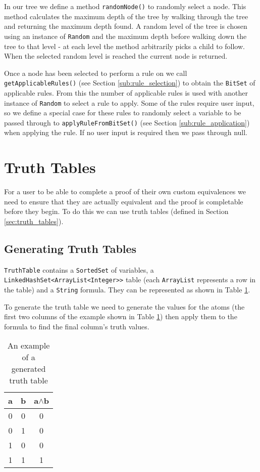 \documentclass{report}
\begin{document}
In our tree we define a method {\tt randomNode()} to randomly select a node. This method calculates the maximum depth of the tree by walking through the tree and returning the maximum depth found. A random level of the tree is chosen using an instance of {\tt Random} and the maximum depth before walking down the tree to that level - at each level the method arbitrarily picks a child to follow. When the selected random level is reached the current node is returned.

Once a node has been selected to perform a rule on we call {\tt getApplicableRules()} (see Section \ref{sub:rule_selection}) to obtain the {\tt BitSet} of applicable rules. From this the number of applicable rules is used with another instance of {\tt Random} to select a rule to apply. Some of the rules require user input, so we define a special case for these rules to randomly select a variable to be passed through to {\tt applyRuleFromBitSet()} (see Section \ref{sub:rule_application}) when applying the rule. If no user input is required then we pass through null.

\section{Truth Tables}
\label{sec:generating_truth_tables}

For a user to be able to complete a proof of their own custom equivalences we need to ensure that they are actually equivalent and the proof is completable before they begin. To do this we can use truth tables (defined in Section \ref{sec:truth_tables}).

\subsection{Generating Truth Tables}

{\tt TruthTable} contains a {\tt SortedSet} of variables, a {\tt LinkedHashSet<ArrayList<Integer>>} table (each {\tt ArrayList} represents a row in the table) and a {\tt String} formula. They can be represented as shown in Table \ref{table:generated_truth_table}. 

To generate the truth table we need to generate the values for the atoms (the first two columns of the example shown in Table \ref{table:generated_truth_table}) then apply them to the formula to find the final column's truth values.

\begin{table}[h]
  \begin{center}
    \begin{tabular}{ || c | c || c || }
      \hline
      a & b & a$\land$b \\ \hline
      0 & 0 & 0 \\
      0 & 1 & 0 \\
      1 & 0 & 0 \\
      1 & 1 & 1 \\
      \hline
    \end{tabular}
  \end{center}
  \caption{An example of a generated truth table}
  \label{table:generated_truth_table}
\end{table}
\end{document}

